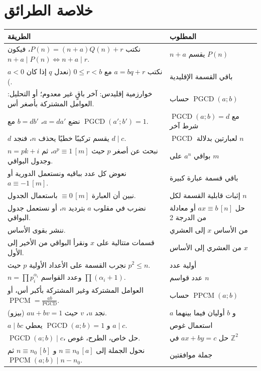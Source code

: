 \documentclass[12pt,a4paper]{article}
\newcommand{\Z}{\mathbb{Z}}
\newcommand{\pgcd}{\operatorname{PGCD}}
\newcommand{\ppcm}{\operatorname{PPCM}}
\begin{document}
\section{خلاصة الطرائق}
\begin{center}
\renewcommand{\arraystretch}{1.3}
\begin{tabular}{|p{}|p{}|}\hline
\rowcolor{cSec!12}\textbf{الطريقة} & \textbf{المطلوب}\\\hline
نكتب $P(n)=(n+a)Q(n)+r$، فيكون $n+a\mid P(n)\iff n+a\mid r$. & $n+a$ يقسم $P(n)$\\\hline
نكتب $a=bq+r$ مع $0\leqslant r<b$ (نعدل $q$ إذا كان $a<0$). & باقي القسمة الإقليدية\\\hline
خوارزمية إقليدس: آخر باقٍ غير معدوم؛ أو التحليل: العوامل المشتركة بأصغر أس. & حساب $\pgcd(a;b)$\\\hline
نضع $a=da'$، $b=db'$ مع $\pgcd(a';b')=1$. & $\pgcd(a;b)=d$ مع شرط آخر\\\hline
$d$ يقسم تركيبًا خطيًا يحذف $n$، فنجد $d\mid c$. & $\pgcd$ لعبارتين بدلالة $n$\\\hline
نبحث عن أصغر $p$ حيث $a^p\equiv1\,[m]$، ثم $n=pk+i$ وجدول البواقي. & بواقي $a^n$ على $m$\\\hline
نعوض كل عدد بباقيه ونستعمل الدورية أو $a\equiv-1\,[m]$. & باقي قسمة عبارة كبيرة\\\hline
نبين أن العبارة $\equiv0\,[m]$ باستعمال الجدول. & إثبات قابلية القسمة لكل $n$\\\hline
نضرب في مقلوب $a$ بترديد $n$، أو نستعمل جدول البواقي. & حل $ax\equiv b\,[n]$ أو معادلة من الدرجة 2\\\hline
ننشر بقوى الأساس. & من الأساس $x$ إلى العشري\\\hline
قسمات متتالية على $x$ ونقرأ البواقي من الأخير إلى الأول. & من العشري إلى الأساس $x$\\\hline
نجرب القسمة على الأعداد الأولية $p$ حيث $p^2\leqslant n$. & أولية عدد\\\hline
$n=\prod p_i^{\alpha_i}$ وعدد القواسم $\prod(\alpha_i+1)$. & عدد قواسم $n$\\\hline
العوامل المشتركة وغير المشتركة بأكبر أس، أو $\ppcm=\frac{ab}{\pgcd}$. & حساب $\ppcm(a;b)$\\\hline
نجد $u$، $v$ حيث $au+bv=1$ (بيزو). & $a$ و $b$ أوليان فيما بينهما\\\hline
$a\mid bc$ و $\pgcd(a;b)=1$ يعطي $a\mid c$. & استعمال غوص\\\hline
$\pgcd(a;b)\mid c$، حل خاص، الطرح، غوص. & حل $ax+by=c$ في $\Z^2$\\\hline
نحول الجملة إلى $n\equiv n_0\,[a]$ و $n\equiv n_0\,[b]$ ثم $\ppcm(a;b)\mid n-n_0$. & جملة موافقتين\\\hline
\end{tabular}
\end{center}
\end{document}

